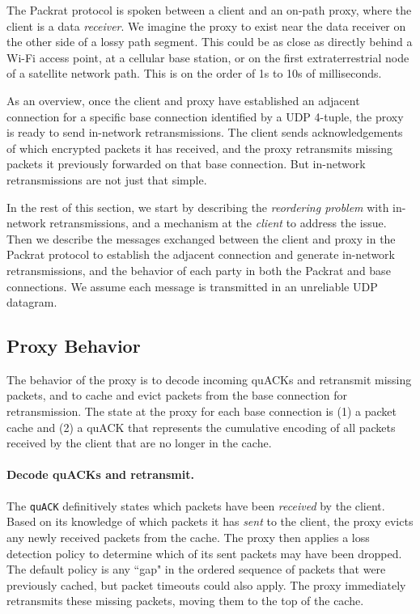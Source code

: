 The Packrat protocol is spoken between a client and an on-path proxy, where the
client is a data \textit{receiver}. We imagine the proxy to exist near the data
receiver on the other side of a lossy path segment. This could be as close as
directly behind a Wi-Fi access point, at a cellular base station, or on the
first extraterrestrial node of a satellite network path. This is on the order
of 1s to 10s of milliseconds.

As an overview, once the client and proxy have established an adjacent
connection for a specific base connection identified by a UDP 4-tuple, the
proxy is ready to send in-network retransmissions. The client sends
acknowledgements of which encrypted packets it has received, and the proxy retransmits missing
packets it previously forwarded on that base connection.
But in-network retransmissions are not just that simple.

In the rest of this section, we start by describing the \textit
{reordering problem} with in-network retransmissions, and a mechanism at
the \textit{client} to address the issue. Then we describe the messages
exchanged between the client and proxy in the Packrat protocol to establish the
adjacent connection and generate in-network retransmissions,
and the behavior of each party in both the Packrat and base
connections. We assume each message is transmitted in an unreliable UDP
datagram.

\subsection{Proxy Behavior}
\label{sec:packrat:protocol:proxy-behavior}

The behavior of the proxy is to decode incoming quACKs and retransmit missing
packets, and to cache and evict packets from the base connection for
retransmission. The state at the proxy for each base connection is (1) a packet
cache and (2) a quACK that represents the cumulative encoding of all packets
received by the client that are no longer in the cache.

\paragraph{Decode quACKs and retransmit.}

The \texttt{quACK} definitively states which packets have been \textit{received}
by the client. Based on its knowledge of which packets it has \textit{sent} to
the client, the proxy evicts any newly received packets from the cache. The
proxy then applies a loss detection policy to determine which of its sent
packets may have been dropped. The default
policy is any ``gap" in the ordered sequence of packets that were previously
cached, but packet timeouts could also apply. The proxy immediately retransmits
these missing packets, moving them to the top of the cache.


